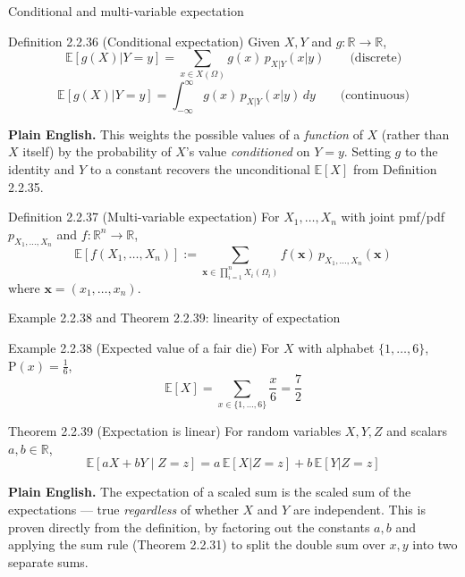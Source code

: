 \documentclass[aspectratio=169,10pt]{beamer}
\begin{document}
\begin{frame}{Conditional and multi-variable expectation}
\begin{block}{Definition 2.2.36 (Conditional expectation)}
Given $X,Y$ and $g:\mathbb{R}\to\mathbb{R}$,
\[ \mathbb{E}[g(X)|Y=y] = \sum_{x\in X(\Omega)} g(x)\,p_{X|Y}(x|y)
\qquad\text{(discrete)} \]
\[ \mathbb{E}[g(X)|Y=y] = \int_{-\infty}^{\infty} g(x)\,p_{X|Y}(x|y)\,dy
\qquad\text{(continuous)} \]
\end{block}
\textbf{Plain English.} This weights the possible values of a \emph{function}
of $X$ (rather than $X$ itself) by the probability of $X$'s value
\emph{conditioned} on $Y=y$. Setting $g$ to the identity and $Y$ to a
constant recovers the unconditional $\mathbb{E}[X]$ from Definition 2.2.35.

\begin{block}{Definition 2.2.37 (Multi-variable expectation)}
For $X_1,\ldots,X_n$ with joint pmf/pdf $p_{X_1,\ldots,X_n}$ and
$f:\mathbb{R}^n\to\mathbb{R}$,
\[ \mathbb{E}[f(X_1,\ldots,X_n)] := \sum_{\mathbf{x}\in\prod_{i=1}^n X_i(\Omega_i)} f(\mathbf{x})\,p_{X_1,\ldots,X_n}(\mathbf{x}) \]
where $\mathbf{x}=(x_1,\ldots,x_n)$.
\end{block}
\end{frame}

\begin{frame}{Example 2.2.38 and Theorem 2.2.39: linearity of expectation}
\begin{block}{Example 2.2.38 (Expected value of a fair die)}
For $X$ with alphabet $\{1,\ldots,6\}$, $\mathrm{P}(x)=\tfrac16$,
\[ \mathbb{E}[X] = \sum_{x\in\{1,\ldots,6\}} \frac{x}{6} = \frac72 \]
\end{block}
\begin{block}{Theorem 2.2.39 (Expectation is linear)}
For random variables $X,Y,Z$ and scalars $a,b\in\mathbb{R}$,
\[ \mathbb{E}[aX+bY \mid Z=z] = a\,\mathbb{E}[X|Z=z] + b\,\mathbb{E}[Y|Z=z] \]
\end{block}
\textbf{Plain English.} The expectation of a scaled sum is the scaled sum of
the expectations --- true \emph{regardless} of whether $X$ and $Y$ are
independent. This is proven directly from the definition, by factoring out
the constants $a,b$ and applying the sum rule (Theorem 2.2.31) to split the
double sum over $x,y$ into two separate sums.
\end{frame}
\end{document}
